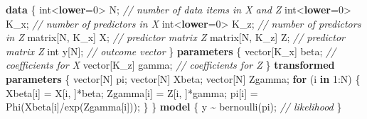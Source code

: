 \documentclass[
]{book}
\newenvironment{Shaded}{\begin{snugshade}}{\end{snugshade}}
\newcommand{\CommentTok}[1]{\textcolor[rgb]{0.56,0.35,0.01}{\textit{#1}}}
\newcommand{\ControlFlowTok}[1]{\textcolor[rgb]{0.13,0.29,0.53}{\textbf{#1}}}
\newcommand{\DataTypeTok}[1]{\textcolor[rgb]{0.13,0.29,0.53}{#1}}
\newcommand{\DecValTok}[1]{\textcolor[rgb]{0.00,0.00,0.81}{#1}}
\newcommand{\KeywordTok}[1]{\textcolor[rgb]{0.13,0.29,0.53}{\textbf{#1}}}
\newcommand{\NormalTok}[1]{#1}
\begin{document}
\begin{Shaded}
\begin{Highlighting}[]
\KeywordTok{data}\NormalTok{ \{}
  \DataTypeTok{int}\NormalTok{\textless{}}\KeywordTok{lower}\NormalTok{=}\DecValTok{0}\NormalTok{\textgreater{} N;     }\CommentTok{// number of data items in X and Z}
  \DataTypeTok{int}\NormalTok{\textless{}}\KeywordTok{lower}\NormalTok{=}\DecValTok{0}\NormalTok{\textgreater{} K\_x;   }\CommentTok{// number of predictors in X}
  \DataTypeTok{int}\NormalTok{\textless{}}\KeywordTok{lower}\NormalTok{=}\DecValTok{0}\NormalTok{\textgreater{} K\_z;   }\CommentTok{// number of predictors in Z}
  \DataTypeTok{matrix}\NormalTok{[N, K\_x] X;   }\CommentTok{// predictor matrix Z}
  \DataTypeTok{matrix}\NormalTok{[N, K\_z] Z;   }\CommentTok{// predictor matrix Z}
  \DataTypeTok{int}\NormalTok{ y[N];           }\CommentTok{// outcome vector}
\NormalTok{\}}
\KeywordTok{parameters}\NormalTok{ \{}
  \DataTypeTok{vector}\NormalTok{[K\_x] beta;       }\CommentTok{// coefficients for X}
  \DataTypeTok{vector}\NormalTok{[K\_z] gamma;       }\CommentTok{// coefficients for Z}
\NormalTok{\}}
\KeywordTok{transformed parameters}\NormalTok{ \{}
  \DataTypeTok{vector}\NormalTok{[N] pi;}
  \DataTypeTok{vector}\NormalTok{[N] Xbeta;}
  \DataTypeTok{vector}\NormalTok{[N] Zgamma;}
  \ControlFlowTok{for}\NormalTok{ (i }\ControlFlowTok{in} \DecValTok{1}\NormalTok{:N) \{}
\NormalTok{    Xbeta[i] = X[i, ]*beta;}
\NormalTok{    Zgamma[i] = Z[i, ]*gamma;}
\NormalTok{    pi[i] = Phi(Xbeta[i]/exp(Zgamma[i]));}
\NormalTok{  \}}
\NormalTok{\}}
\KeywordTok{model}\NormalTok{ \{}
\NormalTok{  y \textasciitilde{} bernoulli(pi);  }\CommentTok{// likelihood}
\NormalTok{\}}
\end{Highlighting}
\end{Shaded}
\end{document}

